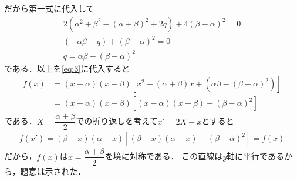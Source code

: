 \documentclass[../../main.tex]{subfiles}
\begin{document}
だから第一式に代入して
\begin{align}
  2\left(\alpha^2+\beta^2 - (\alpha+\beta)^2 + 2q\right) + 4(\beta-\alpha)^2 = 0 \\
  \left(- \alpha\beta + q\right) + (\beta-\alpha)^2 = 0 \\
  q = \alpha\beta - (\beta-\alpha)^2 \label{eq:7}
\end{align}
である．以上を\cref{eq:3}に代入すると
\begin{align}
  f(x)
  &= (x-\alpha)(x-\beta)\left[x^2 - (\alpha+\beta)x + (\alpha\beta - (\beta-\alpha)^2)\right] \\
  &= (x-\alpha)(x-\beta)\left[(x-\alpha)(x-\beta)  - (\beta-\alpha)^2\right]
\end{align}
である．$X=\dfrac{\alpha+\beta}{2}$での折り返しを考えて$x' = 2X-x$とすると
\begin{align}
  f(x') = \left(\beta-x\right)\left(\alpha-x\right)\left[(\beta-x)(\alpha-x) - (\beta-\alpha)^2\right] = f(x)
\end{align}
だから，$f(x)$は$x=\dfrac{\alpha+\beta}{2}$を境に対称である．
この直線は$y$軸に平行であるから，題意は示された．
\end{document}
